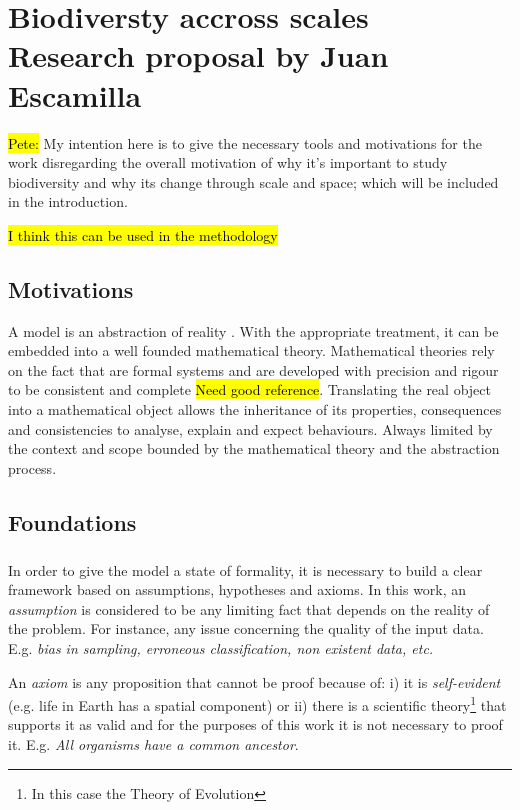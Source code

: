 

\chapter*{Biodiversty accross scales\\ \small{Research proposal by Juan Escamilla}} \label{Meeting:Second}

\hl{Pete:}
My intention here is to give the necessary tools and motivations for the work disregarding the overall motivation of why it's important to study biodiversity and why its change through scale and space; which will be included in the introduction.

\hl{I think this can be used in the methodology}


\section{Motivations}
A model is an abstraction of reality \citep{smith-env-mod}. With the appropriate treatment, it can be embedded into a well founded mathematical theory. Mathematical theories rely on the fact that are formal systems and are developed with precision and rigour to be consistent and complete \hl{Need good reference}. Translating the real object into a mathematical object allows the inheritance of its properties, consequences and consistencies to analyse, explain and expect behaviours. Always limited by the context and scope bounded by the mathematical theory and the abstraction process.   

\section{Foundations}
\paragraph{}
In order to give the model a state of formality, it is necessary to build a clear framework based on assumptions, hypotheses and axioms. 
In this work, an {\em assumption} is considered to be any limiting fact that depends on the reality of the problem. For instance, any issue concerning the quality of the input data. E.g. {\em bias in sampling, erroneous classification, non existent data, etc.}

An {\em axiom} is any proposition that cannot be proof because of: i) it is {\em self-evident} (e.g. life in Earth has a spatial component) or ii) there is a scientific theory\footnote{In this case the Theory of Evolution} that supports it as valid and for the purposes of this work it is not necessary to proof it. E.g. {\em All organisms have a common ancestor}. 

